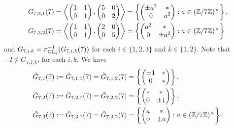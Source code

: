 \begin{equation*}
\begin{split}
G_{7,3,1}(7) &= \left\langle \begin{pmatrix} 1 & 1 \\ 0 & 1 \end{pmatrix}, \begin{pmatrix} 5 & 0 \\ 0 & 2 \end{pmatrix} \right\rangle = \left\{ \begin{pmatrix} \pm a^2 & * \\ 0 & a^2 \end{pmatrix} : a \in (\mathbb{Z}/7\mathbb{Z})^\times \right\}, \\
G_{7,3,2}(7) &= \left\langle \begin{pmatrix} 1 & 1 \\ 0 & 1 \end{pmatrix}, \begin{pmatrix} 2 & 0 \\ 0 & 5 \end{pmatrix} \right\rangle = \left\{ \begin{pmatrix} a^2 & * \\ 0 & \pm a^2 \end{pmatrix} : a \in (\mathbb{Z}/7\mathbb{Z})^\times \right\}
\end{split}
\end{equation*}
and $G_{7,i,k} = \pi_{\operatorname{GL}_2}^{-1}(G_{7,i,k}(7))$ for each $i \in \{ 1, 2, 3 \}$ and $k \in \{1,2 \}$. Note that $-I \notin G_{7,i,k}$, for each $i,k$. We have 
\begin{equation} \label{tildeGlevel7groups}
\begin{split}
\tilde{G}_{7,1}(7) &:= \tilde{G}_{7,1,1}(7) = \tilde{G}_{7,1,2}(7) = \left\{ \begin{pmatrix} \pm 1 & * \\ 0 & * \end{pmatrix} \right\}, \\
\tilde{G}_{7,2}(7) &:= \tilde{G}_{7,2,1}(7) = \tilde{G}_{7,2,2}(7) = \left\{ \begin{pmatrix} * & * \\ 0 & \pm 1 \end{pmatrix} \right\}, \\
\tilde{G}_{7,3}(7) &:= \tilde{G}_{7,3,1}(7) = \tilde{G}_{7,3,2}(7) = \left\{ \begin{pmatrix} a & * \\ 0 & \pm a \end{pmatrix} : a \in (\mathbb{Z}/7\mathbb{Z})^\times \right\}.
\end{split}
\end{equation}

